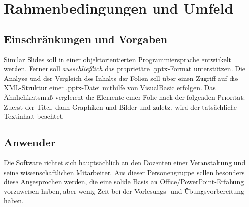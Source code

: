 \section{Rahmenbedingungen und Umfeld}

\subsection{Einschränkungen und Vorgaben}
Similar Slides soll in einer objektorientierten Programmiersprache entwickelt werden. Ferner soll \textit{ausschließlich} das proprietäre .pptx-Format unterstützen. Die Analyse und der Vergleich des Inhalts der Folien soll über einen Zugriff auf die XML-Struktur einer .pptx-Datei mithilfe von VisualBasic erfolgen. Das Ähnlichkeitsmaß vergleicht die Elemente einer Folie nach der folgenden Priorität: Zuerst der Titel, dann Graphiken und Bilder und zuletzt wird der tatsächliche Textinhalt beachtet.



\subsection{Anwender}
Die Software richtet sich hauptsächlich an den Dozenten einer Veranstaltung und seine wissenschaftlichen Mitarbeiter. Aus dieser Personengruppe sollen besonders diese Angesprochen werden, die eine solide Basis an Office/PowerPoint-Erfahung vorzuweisen haben, aber wenig Zeit bei der Vorlesungs- und Übungsvorbereitung haben. 



